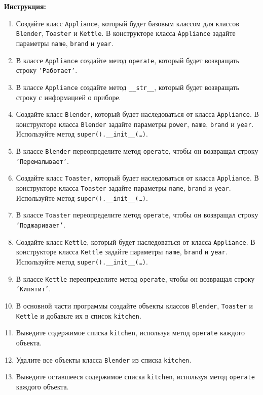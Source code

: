 \begin{enumerate}
\textbf{Инструкция:}
\begin{enumerate}
    \item Создайте класс \texttt{Appliance}, который будет базовым классом для классов \texttt{Blender}, \texttt{Toaster} и \texttt{Kettle}. В конструкторе класса \texttt{Appliance} задайте параметры \texttt{name}, \texttt{brand} и \texttt{year}.
    \item В классе \texttt{Appliance} создайте метод \texttt{operate}, который будет возвращать строку \texttt{'Работает'}.
    \item В классе \texttt{Appliance} создайте метод \texttt{\_\_str\_\_}, который будет возвращать строку с информацией о приборе.
    \item Создайте класс \texttt{Blender}, который будет наследоваться от класса \texttt{Appliance}. В конструкторе класса \texttt{Blender} задайте параметры \texttt{power}, \texttt{name}, \texttt{brand} и \texttt{year}. Используйте метод \texttt{super().\_\_init\_\_(\ldots)}.
    \item В классе \texttt{Blender} переопределите метод \texttt{operate}, чтобы он возвращал строку \texttt{'Перемалывает'}.
    \item Создайте класс \texttt{Toaster}, который будет наследоваться от класса \texttt{Appliance}. В конструкторе класса \texttt{Toaster} задайте параметры \texttt{name}, \texttt{brand} и \texttt{year}. Используйте метод \texttt{super().\_\_init\_\_(\ldots)}.
    \item В классе \texttt{Toaster} переопределите метод \texttt{operate}, чтобы он возвращал строку \texttt{'Поджаривает'}.
    \item Создайте класс \texttt{Kettle}, который будет наследоваться от класса \texttt{Appliance}. В конструкторе класса \texttt{Kettle} задайте параметры \texttt{name}, \texttt{brand} и \texttt{year}. Используйте метод \texttt{super().\_\_init\_\_(\ldots)}.
    \item В классе \texttt{Kettle} переопределите метод \texttt{operate}, чтобы он возвращал строку \texttt{'Кипятит'}.
    \item В основной части программы создайте объекты классов \texttt{Blender}, \texttt{Toaster} и \texttt{Kettle} и добавьте их в список \texttt{kitchen}.
    \item Выведите содержимое списка \texttt{kitchen}, используя метод \texttt{operate} каждого объекта.
    \item Удалите все объекты класса \texttt{Blender} из списка \texttt{kitchen}.
    \item Выведите оставшееся содержимое списка \texttt{kitchen}, используя метод \texttt{operate} каждого объекта.

\end{enumerate}
\end{enumerate}
